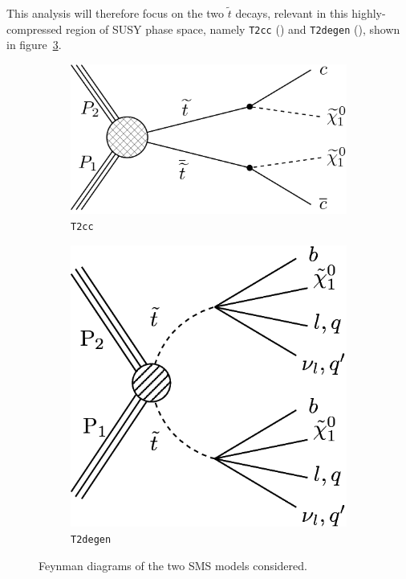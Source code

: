 This analysis will therefore focus on the two $\tilde{t}$ decays, relevant in
this highly-compressed region of SUSY phase space, namely \texttt{T2cc}
(\Ttwocc) and \texttt{T2degen} (\Ttwodegen), shown in
figure~\ref{fig:model_feynman}.

\begin{figure}[h!]
  \centering
  \begin{subfigure}{0.35\textwidth}
    \includegraphics[width=\textwidth]{Figs/feynman/T2cc_feynman_new.pdf}
    \caption{\texttt{T2cc}}
    \label{fig:t2cc_feyn}
  \end{subfigure}
  \begin{subfigure}{0.35\textwidth}
    \includegraphics[width=\textwidth]{Figs/feynman/T2DegenerateStop_feyn.png}
    \caption{\texttt{T2degen}}
    \label{fig:t2degen_feyn}
  \end{subfigure}
  \caption{Feynman diagrams of the two SMS models considered.}
  \label{fig:model_feynman}
\end{figure}

